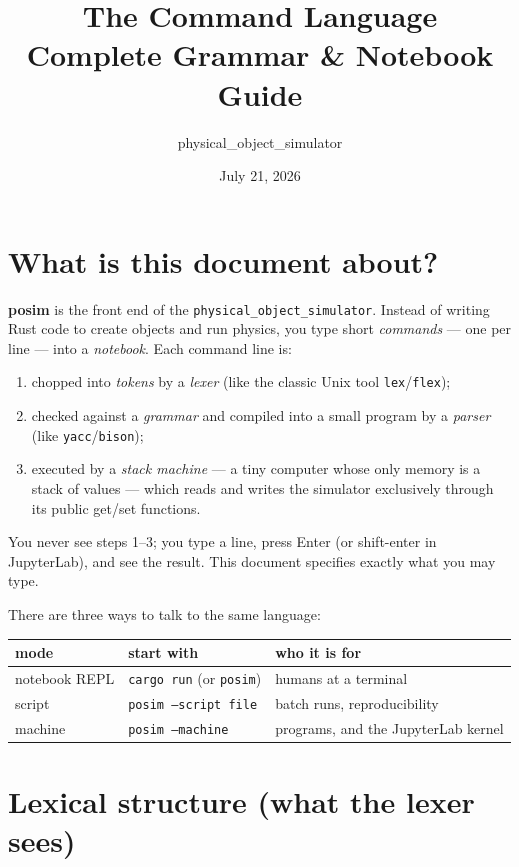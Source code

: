 \documentclass[11pt]{article}
\title{The \code{posim} Command Language\\[2pt]
       \large Complete Grammar \& Notebook Guide}
\author{physical\_object\_simulator}
\date{July 21, 2026}
\newcommand{\code}[1]{\texttt{#1}}
\begin{document}
\maketitle
\tableofcontents

\section{What is this document about?}

\textbf{posim} is the front end of the \code{physical\_object\_simulator}.
Instead of writing Rust code to create objects and run physics, you type
short \emph{commands} --- one per line --- into a \emph{notebook}. Each
command line is:
\begin{enumerate}
\item chopped into \emph{tokens} by a \emph{lexer} (like the classic Unix
      tool \code{lex}/\code{flex});
\item checked against a \emph{grammar} and compiled into a small program
      by a \emph{parser} (like \code{yacc}/\code{bison});
\item executed by a \emph{stack machine} --- a tiny computer whose only
      memory is a stack of values --- which reads and writes the simulator
      exclusively through its public get/set functions.
\end{enumerate}
You never see steps 1--3; you type a line, press Enter (or shift-enter in
JupyterLab), and see the result. This document specifies exactly what you
may type.

There are three ways to talk to the same language:

\begin{center}
\begin{tabular}{lll}
\textbf{mode} & \textbf{start with} & \textbf{who it is for}\\\hline
notebook REPL & \code{cargo run} (or \code{posim}) & humans at a terminal\\
script        & \code{posim --script file}         & batch runs, reproducibility\\
machine       & \code{posim --machine}             & programs, and the JupyterLab kernel\\
\end{tabular}
\end{center}

\section{Lexical structure (what the lexer sees)}
\end{document}
